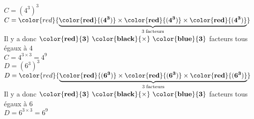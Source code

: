 \begin{corrige}
\begin{spacing}{2}
            \medskip
            $C=\left(4^3\right)^{3}$\\
            $C=\color{red}{\underbrace{\mathbf{\color{red}{(4^3)}} \times \mathbf{\color{red}{(4^3)}}\times \mathbf{\color{red}{(4^3)}}}_{3\thickspace\text{facteurs}}}$\\            
            Il y a donc $\mathbf{\color{red}{3}~\color{black}{\times}~\color{blue}{3}}$ facteurs tous égaux à $4$\\
            $C=4^{3\times3} = 4^{9}$\\
            
            \medskip
            $D=\left(6^3\right)^{3}$\\
            $D=\color{red}{\underbrace{\mathbf{\color{red}{(6^3)}} \times \mathbf{\color{red}{(6^3)}}\times \mathbf{\color{red}{(6^3)}}}_{3\thickspace\text{facteurs}}}$\\            
            Il y a donc $\mathbf{\color{red}{3}~\color{black}{\times}~\color{blue}{3}}$ facteurs tous égaux à $6$\\
            $D=6^{3\times3} = 6^{9}$\\            
        \end{spacing}
\end{corrige}